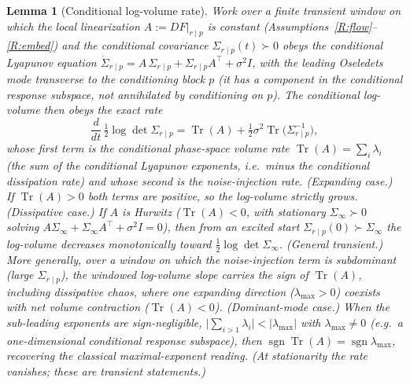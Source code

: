 \documentclass[11pt]{article}
\theoremstyle{plain}
\newtheorem{lemma}[theorem]{Lemma}
\theoremstyle{definition}
\theoremstyle{remark}
\begin{document}
\begin{lemma}[Conditional log-volume rate]\label{lem:covgrowth}
Work over a finite transient window on which the local linearization $A:=DF|_{r\mid p}$ is constant (Assumptions~\ref{R:flow}--\ref{R:embed}) and the conditional covariance $\Sigma_{r\mid p}(t)\succ0$ obeys the conditional Lyapunov equation $\dot\Sigma_{r\mid p}=A\,\Sigma_{r\mid p}+\Sigma_{r\mid p}A^{\top}+\sigma^2 I$, with the leading Oseledets mode \emph{transverse to the conditioning block} $p$ (it has a component in the conditional response subspace, not annihilated by conditioning on $p$). The conditional log-volume then obeys the exact rate
\[
\frac{d}{dt}\,\tfrac12\log\det\Sigma_{r\mid p}=\operatorname{Tr}(A)+\tfrac12\sigma^2\operatorname{Tr}\big(\Sigma_{r\mid p}^{-1}\big),
\]
whose first term is the \emph{conditional phase-space volume rate} $\operatorname{Tr}(A)=\sum_i\lambda_i$ (the sum of the conditional Lyapunov exponents, i.e.\ minus the conditional dissipation rate) and whose second is the noise-injection rate. \emph{(Expanding case.)} If $\operatorname{Tr}(A)>0$ both terms are positive, so the log-volume strictly grows. \emph{(Dissipative case.)} If $A$ is Hurwitz ($\operatorname{Tr}(A)<0$, with stationary $\Sigma_\infty\succ0$ solving $A\Sigma_\infty+\Sigma_\infty A^{\top}+\sigma^2 I=0$), then from an excited start $\Sigma_{r\mid p}(0)\succ\Sigma_\infty$ the log-volume decreases monotonically toward $\tfrac12\log\det\Sigma_\infty$. \emph{(General transient.)} More generally, over a window on which the noise-injection term is subdominant (large $\Sigma_{r\mid p}$), the windowed log-volume slope carries the sign of $\operatorname{Tr}(A)$, including dissipative chaos, where one expanding direction ($\lambda_{\max}>0$) coexists with net volume contraction ($\operatorname{Tr}(A)<0$). \emph{(Dominant-mode case.)} When the sub-leading exponents are sign-negligible, $\big|\sum_{i>1}\lambda_i\big|<|\lambda_{\max}|$ with $\lambda_{\max}\neq0$ (e.g.\ a one-dimensional conditional response subspace), then $\operatorname{sgn}\operatorname{Tr}(A)=\operatorname{sgn}\lambda_{\max}$, recovering the classical maximal-exponent reading. (At stationarity the rate vanishes; these are transient statements.)
\end{lemma}
\end{document}
